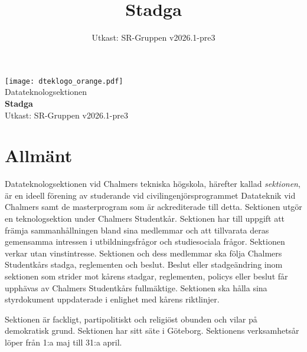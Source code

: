 \documentclass[a4paper]{dteklag}
\title{Stadga}
\date{Utkast: SR-Gruppen v2026.1-pre3}
\begin{document}
\begin{titlepage}
  \thispagestyle{empty} %
  \vspace*{1cm}
  \begin{center}
    \texttt{[image: dteklogo\_orange.pdf]}\\[3em]
    {\Huge Datateknologsektionen}\\[3em]
    {\Huge \textbf{Stadga}}\\[1em]
    Utkast: SR-Gruppen v2026.1-pre3
  \end{center}
\end{titlepage}

\makeheadfoot

\setcounter{tocdepth}{2}
\tableofcontents

\section{Allmänt}
\para[Ändamål] Datateknologsektionen vid Chalmers tekniska högskola, härefter kallad \textit{sektionen}, är en ideell förening av studerande vid civilingenjörsprogrammet Datateknik vid Chalmers samt de masterprogram som är ackrediterade till detta. Sektionen utgör en teknologsektion under Chalmers Studentkår. 
\para Sektionen har till uppgift att främja sammanhållningen bland sina medlemmar och att tillvarata deras gemensamma intressen i utbildningsfrågor och studiesociala frågor. Sektionen verkar utan vinstintresse.
\para Sektionen och dess medlemmar ska följa Chalmers Studentkårs stadga, reglementen och beslut. Beslut eller stadgeändring inom sektionen som strider mot kårens stadgar, reglementen, policys eller beslut får upphävas av Chalmers Studentkårs fullmäktige. Sektionen ska hålla sina styrdokument uppdaterade i enlighet med kårens riktlinjer. 

\para Sektionen är fackligt, partipolitiskt och religiöst obunden och vilar på demokratisk grund.
\para Sektionen har sitt säte i Göteborg.
\para Sektionens verksamhetsår löper från 1:a maj till 31:a april.


\end{document}
